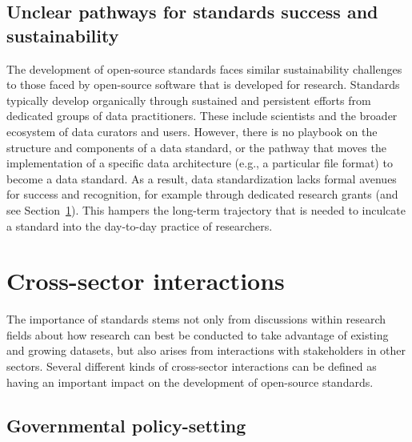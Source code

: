 \documentclass[
  letterpaper,
  DIV=11,
  numbers=noendperiod]{scrartcl}
\begin{document}
\subsection{Unclear pathways for standards success and
sustainability}\label{unclear-pathways-for-standards-success-and-sustainability}

The development of open-source standards faces similar sustainability
challenges to those faced by open-source software that is developed for
research. Standards typically develop organically through sustained and
persistent efforts from dedicated groups of data practitioners. These
include scientists and the broader ecosystem of data curators and users.
However, there is no playbook on the structure and components of a data
standard, or the pathway that moves the implementation of a specific
data architecture (e.g., a particular file format) to become a data
standard. As a result, data standardization lacks formal avenues for
success and recognition, for example through dedicated research grants
(and see Section~\ref{sec-cross-sector}). This hampers the long-term
trajectory that is needed to inculcate a standard into the day-to-day
practice of researchers.

\section{Cross-sector interactions}\label{sec-cross-sector}

The importance of standards stems not only from discussions within
research fields about how research can best be conducted to take
advantage of existing and growing datasets, but also arises from
interactions with stakeholders in other sectors. Several different kinds
of cross-sector interactions can be defined as having an important
impact on the development of open-source standards.

\subsection{Governmental
policy-setting}\label{governmental-policy-setting}
\end{document}
